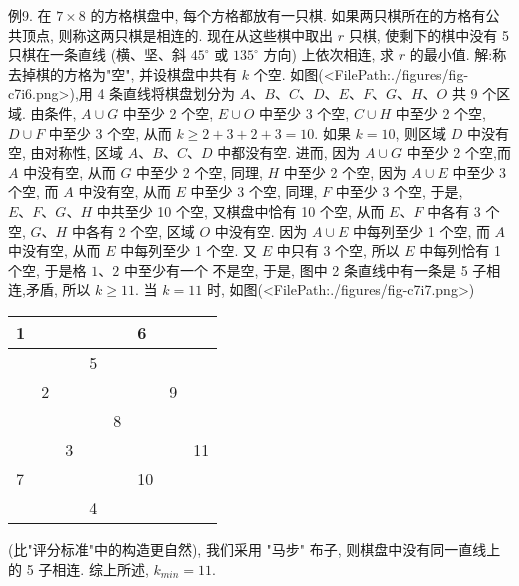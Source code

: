 例9. 在 $7 \times 8$ 的方格棋盘中, 每个方格都放有一只棋.
如果两只棋所在的方格有公共顶点, 则称这两只棋是相连的.
现在从这些棋中取出 $r$ 只棋, 使剩下的棋中没有 5 只棋在一条直线 (横、坚、斜 $45^{\circ}$ 或 $135^{\circ}$ 方向) 上依次相连, 求 $r$ 的最小值.
解:称去掉棋的方格为"空", 并设棋盘中共有 $k$ 个空.
如图(<FilePath:./figures/fig-c7i6.png>),用 4 条直线将棋盘划分为 $A 、B 、 C 、 D 、 E 、 F 、 G 、 H 、 O$ 共 9 个区域.
由条件, $A \cup G$ 中至少 2 个空, $E \cup O$ 中至少 3 个空, $C \cup H$ 中至少 2 个空, $D \cup F$ 中至少 3 个空, 从而 $k \geqslant 2+3+2+3=10$.
如果 $k=10$, 则区域 $D$ 中没有空, 由对称性, 区域 $A 、 B 、 C 、 D$ 中都没有空.
进而, 因为 $A \cup G$ 中至少 2 个空,而 $A$ 中没有空, 从而 $G$ 中至少 2 个空, 同理, $H$ 中至少 2 个空, 因为 $A \cup E$ 中至少 3 个空, 而 $A$ 中没有空, 从而 $E$
中至少 3 个空, 同理, $F$ 中至少 3 个空, 于是, $E 、 F 、 G 、 H$ 中共至少 10 个空, 又棋盘中恰有 10 个空, 从而 $E 、 F$ 中各有 3 个空, $G 、 H$ 中各有 2 个空, 区域 $O$ 中没有空.
因为 $A \cup E$ 中每列至少 1 个空, 而 $A$ 中没有空, 从而 $E$ 中每列至少 1 个空.
又 $E$ 中只有 3 个空, 所以 $E$ 中每列恰有 1 个空, 于是格 $1 、 2$ 中至少有一个
不是空, 于是, 图中 2 条直线中有一条是 5 子相连,矛盾, 所以 $k \geqslant 11$.
当 $k=11$ 时, 如图(<FilePath:./figures/fig-c7i7.png>)
\begin{tabular}{|l|l|l|l|l|l|l|l|}
\hline 1 & & & & & 6 & & \\
\hline & & & 5 & & & & \\
\hline & 2 & & & & & 9 & \\
\hline & & & & 8 & & & \\
\hline & & 3 & & & & & 11 \\
\hline 7 & & & & & 10 & & \\
\hline & & & 4 & & & & \\
\hline
\end{tabular}
(比"评分标准"中的构造更自然), 我们采用 "马步" 布子, 则棋盘中没有同一直线上的 5 子相连.
综上所述, $k_{min}=11$.



